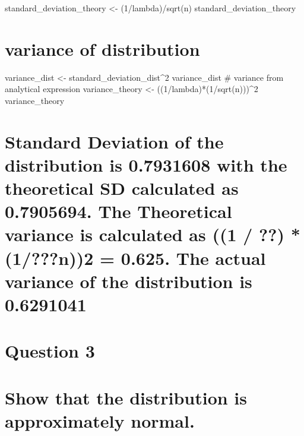 \documentclass[
]{article}
\begin{document}
standard\_deviation\_theory \textless- (1/lambda)/sqrt(n)
standard\_deviation\_theory

\hypertarget{variance-of-distribution}{%
\section{variance of distribution}\label{variance-of-distribution}}

variance\_dist \textless- standard\_deviation\_dist\^{}2 variance\_dist
\# variance from analytical expression variance\_theory \textless-
((1/lambda)*(1/sqrt(n)))\^{}2 variance\_theory

\hypertarget{standard-deviation-of-the-distribution-is-0.7931608-with-the-theoretical-sd-calculated-as-0.7905694.-the-theoretical-variance-is-calculated-as-1-1n2-0.625.-the-actual-variance-of-the-distribution-is-0.6291041}{%
\section{Standard Deviation of the distribution is 0.7931608 with the
theoretical SD calculated as 0.7905694. The Theoretical variance is
calculated as ((1 / ??) * (1/???n))2 = 0.625. The actual variance of the
distribution is
0.6291041}\label{standard-deviation-of-the-distribution-is-0.7931608-with-the-theoretical-sd-calculated-as-0.7905694.-the-theoretical-variance-is-calculated-as-1-1n2-0.625.-the-actual-variance-of-the-distribution-is-0.6291041}}

\hypertarget{question-3}{%
\section{Question 3}\label{question-3}}

\hypertarget{show-that-the-distribution-is-approximately-normal.}{%
\section{Show that the distribution is approximately
normal.}\label{show-that-the-distribution-is-approximately-normal.}}
\end{document}
